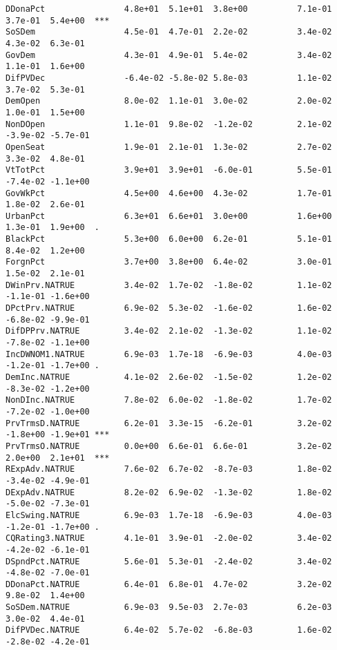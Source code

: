 \documentclass[11pt,leqno]{article}\usepackage[]{graphicx}\usepackage[]{color}
\makeatletter
\newenvironment{kframe}{%
 \def\at@end@of@kframe{}%
 \ifinner\ifhmode%
  \def\at@end@of@kframe{\end{minipage}}%
  \begin{minipage}{\columnwidth}%
 \fi\fi%
 \def\FrameCommand##1{\hskip\@totalleftmargin \hskip-\fboxsep
 \colorbox{shadecolor}{##1}\hskip-\fboxsep
     \hskip-\linewidth \hskip-\@totalleftmargin \hskip\columnwidth}%
 \MakeFramed {\advance\hsize-\width
   \@totalleftmargin\z@ \linewidth\hsize
   \@setminipage}}%
 {\par\unskip\endMakeFramed%
 \at@end@of@kframe}
\newenvironment{knitrout}{}{} %
\theoremstyle{newstyle}
\makeatother
\begin{document}
\begin{knitrout}
\begin{kframe}
\begin{verbatim}
DDonaPct                4.8e+01  5.1e+01  3.8e+00          7.1e-01  3.7e-01  5.4e+00  ***     
SoSDem                  4.5e-01  4.7e-01  2.2e-02          3.4e-02  4.3e-02  6.3e-01          
GovDem                  4.3e-01  4.9e-01  5.4e-02          3.4e-02  1.1e-01  1.6e+00          
DifPVDec                -6.4e-02 -5.8e-02 5.8e-03          1.1e-02  3.7e-02  5.3e-01          
DemOpen                 8.0e-02  1.1e-01  3.0e-02          2.0e-02  1.0e-01  1.5e+00          
NonDOpen                1.1e-01  9.8e-02  -1.2e-02         2.1e-02  -3.9e-02 -5.7e-01         
OpenSeat                1.9e-01  2.1e-01  1.3e-02          2.7e-02  3.3e-02  4.8e-01          
VtTotPct                3.9e+01  3.9e+01  -6.0e-01         5.5e-01  -7.4e-02 -1.1e+00         
GovWkPct                4.5e+00  4.6e+00  4.3e-02          1.7e-01  1.8e-02  2.6e-01          
UrbanPct                6.3e+01  6.6e+01  3.0e+00          1.6e+00  1.3e-01  1.9e+00  .       
BlackPct                5.3e+00  6.0e+00  6.2e-01          5.1e-01  8.4e-02  1.2e+00          
ForgnPct                3.7e+00  3.8e+00  6.4e-02          3.0e-01  1.5e-02  2.1e-01          
DWinPrv.NATRUE          3.4e-02  1.7e-02  -1.8e-02         1.1e-02  -1.1e-01 -1.6e+00         
DPctPrv.NATRUE          6.9e-02  5.3e-02  -1.6e-02         1.6e-02  -6.8e-02 -9.9e-01         
DifDPPrv.NATRUE         3.4e-02  2.1e-02  -1.3e-02         1.1e-02  -7.8e-02 -1.1e+00         
IncDWNOM1.NATRUE        6.9e-03  1.7e-18  -6.9e-03         4.0e-03  -1.2e-01 -1.7e+00 .       
DemInc.NATRUE           4.1e-02  2.6e-02  -1.5e-02         1.2e-02  -8.3e-02 -1.2e+00         
NonDInc.NATRUE          7.8e-02  6.0e-02  -1.8e-02         1.7e-02  -7.2e-02 -1.0e+00         
PrvTrmsD.NATRUE         6.2e-01  3.3e-15  -6.2e-01         3.2e-02  -1.8e+00 -1.9e+01 ***     
PrvTrmsO.NATRUE         0.0e+00  6.6e-01  6.6e-01          3.2e-02  2.0e+00  2.1e+01  ***     
RExpAdv.NATRUE          7.6e-02  6.7e-02  -8.7e-03         1.8e-02  -3.4e-02 -4.9e-01         
DExpAdv.NATRUE          8.2e-02  6.9e-02  -1.3e-02         1.8e-02  -5.0e-02 -7.3e-01         
ElcSwing.NATRUE         6.9e-03  1.7e-18  -6.9e-03         4.0e-03  -1.2e-01 -1.7e+00 .       
CQRating3.NATRUE        4.1e-01  3.9e-01  -2.0e-02         3.4e-02  -4.2e-02 -6.1e-01         
DSpndPct.NATRUE         5.6e-01  5.3e-01  -2.4e-02         3.4e-02  -4.8e-02 -7.0e-01         
DDonaPct.NATRUE         6.4e-01  6.8e-01  4.7e-02          3.2e-02  9.8e-02  1.4e+00          
SoSDem.NATRUE           6.9e-03  9.5e-03  2.7e-03          6.2e-03  3.0e-02  4.4e-01          
DifPVDec.NATRUE         6.4e-02  5.7e-02  -6.8e-03         1.6e-02  -2.8e-02 -4.2e-01         

\end{verbatim}
\end{kframe}
\end{knitrout}
\end{document}
